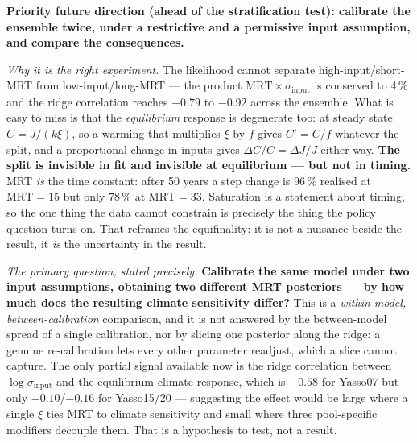 \documentclass[11pt]{article}
\newcommand{\sinput}{\sigma_{\mathrm{input}}}
\begin{document}
\begin{provisional}
\textbf{Priority future direction (ahead of the stratification test): calibrate the ensemble twice,
under a restrictive and a permissive input assumption, and compare the consequences.}

\emph{Why it is the right experiment.} The likelihood cannot separate high-input/short-MRT from
low-input/long-MRT --- the product $\mathrm{MRT}\times\sinput$ is conserved to 4\,\% and the ridge
correlation reaches $-0.79$ to $-0.92$ across the ensemble. What is easy to miss is that the
\emph{equilibrium} response is degenerate too: at steady state $C = J/(k\xi)$, so a warming that
multiplies $\xi$ by $f$ gives $C' = C/f$ whatever the split, and a proportional change in inputs gives
$\Delta C/C = \Delta J/J$ either way. \textbf{The split is invisible in fit and invisible at
equilibrium --- but not in timing.} MRT \emph{is} the time constant: after 50 years a step change is
$96\,\%$ realised at $\mathrm{MRT}=15$ but only $78\,\%$ at $\mathrm{MRT}=33$. Saturation is a
statement about timing, so the one thing the data cannot constrain is precisely the thing the policy
question turns on. That reframes the equifinality: it is not a nuisance beside the result, it
\emph{is} the uncertainty in the result.

\emph{The primary question, stated precisely.} \textbf{Calibrate the same model under two input
assumptions, obtaining two different MRT posteriors --- by how much does the resulting climate
sensitivity differ?} This is a \emph{within-model, between-calibration} comparison, and it is not
answered by the between-model spread of a single calibration, nor by slicing one posterior along the
ridge: a genuine re-calibration lets every other parameter readjust, which a slice cannot capture.
The only partial signal available now is the ridge correlation between $\log\sinput$ and the
equilibrium climate response, which is $-0.58$ for Yasso07 but only $-0.10$/$-0.16$ for Yasso15/20
--- suggesting the effect would be large where a single $\xi$ ties MRT to climate sensitivity and
small where three pool-specific modifiers decouple them. That is a hypothesis to test, not a result.


\end{provisional}
\end{document}
